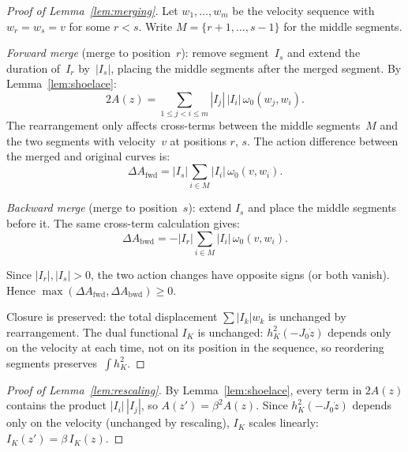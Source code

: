 \begin{proof}[Proof of Lemma~\ref{lem:merging}]
Let $w_1, \ldots, w_m$ be the velocity sequence with
$w_r = w_s = v$ for some $r < s$.
Write $M = \{r{+}1, \ldots, s{-}1\}$ for the middle segments.

\emph{Forward merge} (merge to position~$r$):
remove segment~$I_s$ and extend the duration of~$I_r$
by~$|I_s|$,
placing the middle segments after the merged segment.
By Lemma~\ref{lem:shoelace}:
\[
  2A(z) = \sum_{1 \leq j < i \leq m}
    |I_j|\,|I_i|\,\omega_0(w_j, w_i).
\]
The rearrangement only affects cross-terms
between the middle segments~$M$ and the two
segments with velocity~$v$ at positions $r$, $s$.
The action difference between the merged and
original curves is:
\[
  \Delta A_{\mathrm{fwd}}
  = |I_s| \sum_{i \in M} |I_i|\, \omega_0(v, w_i).
\]

\emph{Backward merge} (merge to position~$s$):
extend $I_s$ and place the middle segments before it.
The same cross-term calculation gives:
\[
  \Delta A_{\mathrm{bwd}}
  = -|I_r| \sum_{i \in M} |I_i|\, \omega_0(v, w_i).
\]

Since $|I_r|, |I_s| > 0$, the two action changes have
opposite signs (or both vanish).
Hence
$\max(\Delta A_{\mathrm{fwd}},
  \Delta A_{\mathrm{bwd}}) \geq 0$.

Closure is preserved: the total displacement
$\sum |I_k| w_k$ is unchanged by rearrangement.
The dual functional $I_K$ is unchanged:
$h_K^2(-J_0 \dot{z})$ depends only on the velocity
at each time, not on its position in the sequence,
so reordering segments preserves~$\int h_K^2$.
\end{proof}

\begin{proof}[Proof of Lemma~\ref{lem:rescaling}]
By Lemma~\ref{lem:shoelace}, every term in $2A(z)$
contains the product $|I_i|\,|I_j|$, so
$A(z') = \beta^2 A(z)$.
Since $h_K^2(-J_0 \dot{z})$ depends only on the velocity
(unchanged by rescaling), $I_K$ scales linearly:
$I_K(z') = \beta\, I_K(z)$.
\end{proof}

